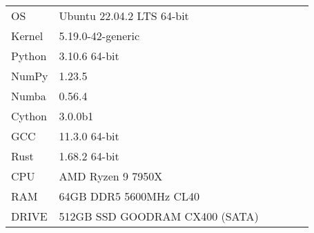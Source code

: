 \begin{tabular}{llllll}
    \midrule\midrule
    OS              & Ubuntu 22.04.2 LTS 64-bit         \\
    Kernel          & 5.19.0-42-generic                 \\
    Python          & 3.10.6 64-bit                     \\
    NumPy           & 1.23.5                            \\
    Numba           & 0.56.4                            \\
    Cython          & 3.0.0b1                           \\
    GCC             & 11.3.0 64-bit                     \\
    Rust            & 1.68.2 64-bit                     \\\midrule
    CPU             & AMD Ryzen 9 7950X                 \\
    RAM             & 64GB DDR5 5600MHz CL40            \\
    DRIVE           & 512GB SSD GOODRAM CX400 (SATA)    \\\midrule
  \end{tabular}
